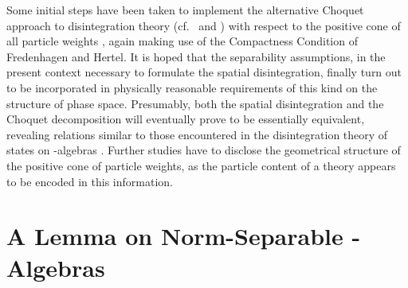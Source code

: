 \documentclass[a4paper,a4paper]{article}
\numberwithin{equation}{section}
\theoremstyle{definition}
\theoremstyle{plain}
\theoremstyle{remark}
\theoremstyle{assumption}
\begin{document}
  Some initial steps have been taken to implement the alternative
  Choquet approach to disintegration theory (cf.~\cite{alfsen:1971}
  and \cite{phelps:1966}) with respect to the positive cone of all
  particle weights \cite{porrmann:2000}, again making use of the
  Compactness Condition of Fredenhagen and Hertel. It is hoped that
  the separability assumptions, in the present context necessary to
  formulate the spatial disintegration, finally turn out to be
  incorporated in physically reasonable requirements of this kind on
  the structure of phase space. Presumably, both the spatial
  disintegration and the Choquet decomposition will eventually prove
  to be essentially equivalent, revealing relations similar to those
  encountered in the disintegration theory of states on \coordHE{}-algebras
  \cite[Chapter~4]{bratteli/robinson:1987}. Further studies have to
  disclose the geometrical structure of the positive cone of particle
  weights, as the particle content of a theory appears to be encoded
  in this information.


\appendix


\section{A Lemma on Norm-Separable \coordHE{}-Algebras}
  \label{sec:separable-algebras}
  
\end{document}
